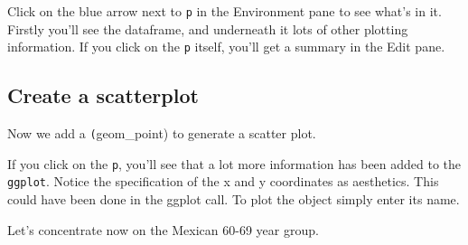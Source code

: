 \documentclass[titlepage]{book}\usepackage{knitr}
\begin{document}
\begin{knitrout}
\color{fgcolor}\begin{kframe}
\begin{alltt}
 \hlkwb{<-} 
\end{alltt}
\end{kframe}
\end{knitrout}
Click on the blue arrow next to \texttt{p} in the Environment pane to see what's in it. Firstly you'll see the dataframe, and underneath it lots of other plotting information.  If you click on the \texttt{p} itself, you'll get a summary in the Edit pane.

\subsection{Create a scatterplot}  

Now we add a \texttt(geom\_point) to generate a scatter plot.
\begin{knitrout}
\color{fgcolor}\begin{kframe}
\begin{alltt}
 \hlkwb{<-}  \hlopt{+} \hlstd{(}\hlstd{(}   
\end{alltt}
\end{kframe}
\end{knitrout}
 If you click on the \texttt{p}, you'll see that a lot more information has been added to the \texttt{ggplot}.  Notice the specification of the x and y coordinates as aesthetics.  This could have been done in the ggplot call.  To plot the object simply enter its name.
 
\begin{knitrout}
\color{fgcolor}\begin{kframe}
\begin{alltt}
\end{alltt}
\end{kframe}
\end{knitrout}

Let's concentrate now on the Mexican  60-69 year group.

\begin{knitrout}
\color{fgcolor}\begin{kframe}
\begin{alltt}
 \hlkwb{<-}  \hlopt{==}\hlopt{==}\hlstd{)}
\end{alltt}
\end{kframe}
\end{knitrout}
\end{document}
